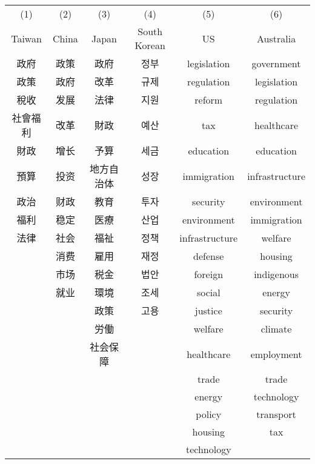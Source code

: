 {
\def\sym#1{\ifmmode^{#1}\else\(^{#1}\)\fi}
\begin{tabular}{c c c c c c}
\hline\hline

\multicolumn{1}{c}{(1)}
&\multicolumn{1}{c}{(2)}
&\multicolumn{1}{c}{(3)}
&\multicolumn{1}{c}{(4)}
&\multicolumn{1}{c}{(5)}
&\multicolumn{1}{c}{(6)}
\\

\multicolumn{1}{c}{Taiwan}
&\multicolumn{1}{c}{China}
&\multicolumn{1}{c}{Japan}
&\multicolumn{1}{c}{South Korean}
&\multicolumn{1}{c}{US}
&\multicolumn{1}{c}{Australia}
\\
\hline
政府 & 政策 & 政府 & 정부 & legislation & government \\
政策 & 政府 & 改革 & 규제 & regulation & legislation \\
稅收 & 发展 & 法律 & 지원 & reform & regulation \\
社會福利 & 改革 & 財政 & 예산 & tax & healthcare \\
財政 & 增长 & 予算 & 세금 & education & education \\
預算 & 投资 & 地方自治体 & 성장 & immigration & infrastructure \\
政治 & 财政 & 教育 & 투자 & security & environment \\
福利 & 稳定 & 医療 & 산업 & environment & immigration \\
法律 & 社会 & 福祉 & 정책 & infrastructure & welfare \\
 & 消费 & 雇用 & 재정 & defense & housing \\
 & 市场 & 税金 & 법안 & foreign & indigenous \\
 & 就业 & 環境 & 조세 & social & energy \\
 &  & 政策 & 고용 & justice & security \\
 &  & 労働 &  & welfare & climate \\
 &  & 社会保障 &  & healthcare & employment \\
 &  &  &  & trade & trade \\
 &  &  &  & energy & technology \\
 &  &  &  & policy & transport \\
 &  &  &  & housing & tax \\
 &  &  &  & technology &  \\
\hline\hline
\end{tabular}
}
